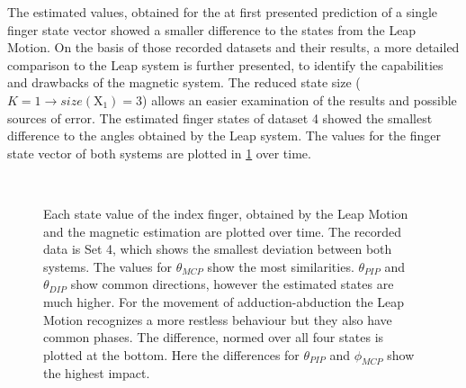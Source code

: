 The estimated values, obtained for the at first presented prediction of a single finger state vector showed a smaller difference to the states from the Leap Motion. On the basis of those recorded datasets and their results, a more detailed comparison to the Leap system is further presented, to identify the capabilities and drawbacks of the magnetic system. The reduced state size ($ K = 1 \rightarrow size(\mathrm{X}_{1}) = 3 $) allows an easier examination of the results and possible sources of error. The estimated finger states of dataset 4 showed the smallest difference to the angles obtained by the Leap system. The values for the finger state vector of both systems are plotted in \ref{fig:bestLeap} over time.
\begin{figure}[!htb]
\centering
{}\\
\caption[Comparison of estimated states, which fit best to Leap data]
{Each state value of the index finger, obtained by the Leap Motion and the magnetic estimation are plotted over time. The recorded data is Set 4, which shows the smallest deviation between both systems. The values for $ \theta_{MCP} $ show the most similarities. $ \theta_{PIP} $ and $ \theta_{DIP} $ show common directions, however the estimated states are much higher. For the movement of adduction-abduction the Leap Motion recognizes a more restless behaviour but they also have common phases. The difference, normed over all four states is plotted at the bottom. Here the differences for $ \theta_{PIP} $ and $ \phi_{MCP} $ show the highest impact.}
\label{fig:bestLeap}
\end{figure} 
